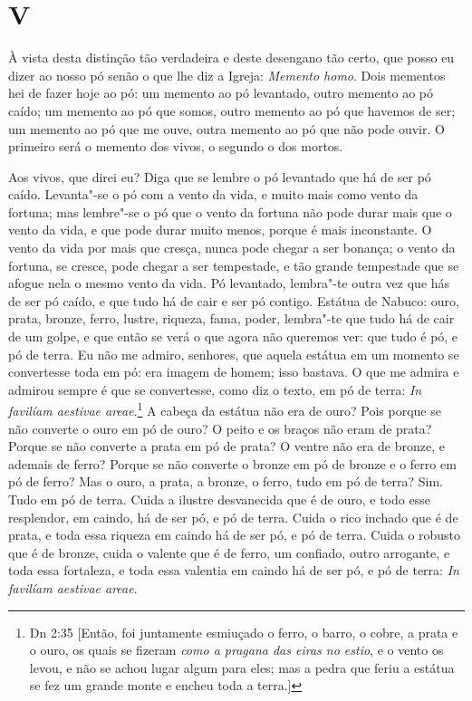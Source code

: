 \section*{V}

À vista desta distinção tão verdadeira e deste desengano tão certo, que
posso eu dizer ao nosso pó senão o que lhe diz a Igreja: \emph{Memento
homo}. Dois mementos hei de fazer hoje ao pó: um memento ao pó
levantado, outro memento ao pó caído; um memento ao pó que somos, outro
memento ao pó que havemos de ser; um memento ao pó que me ouve, outra
memento ao pó que não pode ouvir. O primeiro será o memento dos vivos, o
segundo o dos mortos.

Aos vivos, que direi eu? Diga que se lembre o pó levantado que há de ser
pó caído. Levanta"-se o pó com a vento da vida, e muito
mais como vento da fortuna; mas lembre"-se o pó que o vento da fortuna
não pode durar mais que o vento da vida, e que pode durar muito menos,
porque é mais inconstante. O vento da vida por mais que cresça, nunca
pode chegar a ser bonança; o vento da fortuna, se
cresce, pode chegar a ser tempestade, e tão grande tempestade que se
afogue nela o mesmo vento da vida. Pó levantado, lembra"-te outra vez que
hás de ser pó caído, e que tudo há de cair e ser pó contigo. Estátua de
Nabuco: ouro, prata, bronze, ferro, lustre, riqueza, fama, poder,
lembra"-te que tudo há de cair de um golpe, e que então se verá o que
agora não queremos ver: que tudo é pó, e pó de terra. Eu não me admiro,
senhores, que aquela estátua em um momento se convertesse toda em pó:
era imagem de homem; isso bastava. O que me admira e admirou sempre é
que se convertesse, como diz o texto, em pó de terra: \emph{In favilíam
aestivae areae}.\footnote{Dn 2:35 [Então, foi juntamente esmiuçado o ferro, o barro, o cobre, a prata e o ouro, os quais se fizeram \emph{como a pragana das eiras no estio}, e o vento os levou, e não se achou lugar algum para eles; mas a pedra que feriu a estátua se fez um grande monte e encheu toda a terra.]} A cabeça da estátua não era de ouro? Pois 
porque se não converte o ouro em pó de ouro? O peito e os braços não
eram de prata? Porque se não converte a prata em pó de prata? O ventre
não era de bronze, e ademais de ferro? Porque se não converte o bronze
em pó de bronze e o ferro em pó de ferro? Mas o ouro, a prata, a bronze,
o ferro, tudo em pó de terra? Sim. Tudo em pó de terra. Cuida a ilustre
desvanecida que é de ouro, e todo esse resplendor, em caindo, há de ser
pó, e pó de terra. Cuida o rico inchado que é de prata, e toda essa
riqueza em caindo há de ser pó, e pó de terra. Cuida o robusto que é de
bronze, cuida o valente que é de ferro, um confiado, outro arrogante, e
toda essa fortaleza, e toda essa valentia em caindo há de ser pó, e pó
de terra: \emph{In favilíam aestivae areae}.

